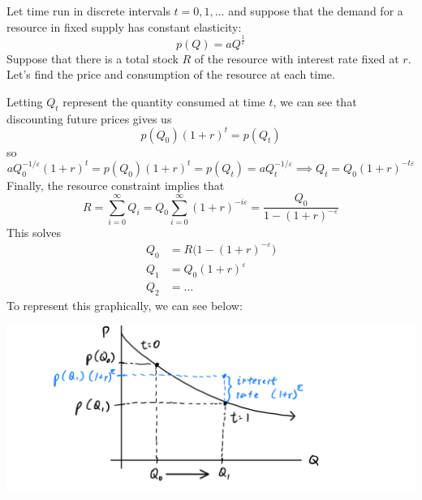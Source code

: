 \documentclass{article}
\begin{document}
      \begin{example}
        Let time run in discrete intervals $t = 0, 1, \ldots$ and suppose that the demand for a resource in fixed supply has constant elasticity: 
        \[p(Q) = a Q^{\frac{1}{\varepsilon}}\]
        Suppose that there is a total stock $R$ of the resource with interest rate fixed at $r$. Let's find the price and consumption of the resource at each time. 

        Letting $Q_t$ represent the quantity consumed at time $t$, we can see that discounting future prices gives us 
        \[p(Q_0) (1 + r)^t = p(Q_t)\]
        so
        \[a Q_0^{-1/\varepsilon} (1 + r)^t = p (Q_0) (1+r)^t = p(Q_t) = a Q_t^{-1/\varepsilon} \implies Q_t = Q_0 (1+r)^{- t \varepsilon}\]
        Finally, the resource constraint implies that 
        \[R = \sum_{i=0}^\infty Q_i = Q_0 \sum_{i=0}^\infty (1+r)^{-i \varepsilon} = \frac{Q_0}{1 - (1+r)^{-\varepsilon}}\]
        This solves 
        \begin{align*}
          Q_0 & = R \big( 1 - (1+r)^{-\varepsilon}\big) \\
          Q_1 & = Q_0 (1 + r)^{\varepsilon}\\
          Q_2 & = \ldots
        \end{align*}
        To represent this graphically, we can see below: 
        \begin{center}
          \includegraphics[scale=0.25]{img/Demand_Curve_Constrained_Resource.PNG}
        \end{center}
      \end{example}
\end{document}
